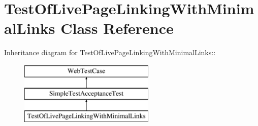 \hypertarget{class_test_of_live_page_linking_with_minimal_links}{
\section{TestOfLivePageLinkingWithMinimalLinks Class Reference}
\label{class_test_of_live_page_linking_with_minimal_links}
}
Inheritance diagram for TestOfLivePageLinkingWithMinimalLinks::\begin{figure}[H]
\begin{center}
\leavevmode
\includegraphics[height=3cm]{class_test_of_live_page_linking_with_minimal_links}
\end{center}
\end{figure}
